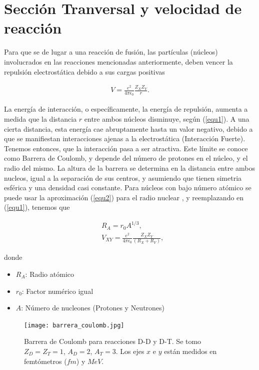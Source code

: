 \documentclass[../main.tex]{subfiles}
\begin{document}
    \section{Sección Tranversal y velocidad de reacción}
	Para que se de lugar a una reacción de fusión, las partículas (núcleos) involucrados en las reacciones mencionadas anteriormente, deben vencer la repulsión electrostática debido a sus cargas positivas  
	
	\begin{align} \label{equ1}
	    V = \frac{e^2}{4\pi\epsilon_0}\frac{Z_XZ_Y}{r}.
	\end{align}
	
	La energía de interacción, o específicamente, la energía de repulsión, aumenta a medida que la distancia $r$ entre ambos núcleos disminuye, según (\ref{equ1}). A una cierta distancia, esta energía cae abruptamente hasta un valor negativo, debido a que se manifiestan interacciones ajenas a la electrostática (Interacción Fuerte). Tenemos entonces, que la interacción pasa a ser atractiva. Este límite se conoce como Barrera de Coulomb, y depende del número de protones en el núcleo, y el radio del mismo. La altura de la barrera se determina en la distancia entre ambos nucleos, igual a la separación de sus centros, y asumiendo que tienen simetria esférica y una densidad casi constante. Para núcleos con bajo número atómico se puede usar la aproximación (\ref{equ2}) para el radio nuclear \cite{krane1987introductory}, y reemplazando en (\ref{equ1}), tenemos que
	
	\begin{align} \label{equ2}
	    &R_A = r_0A^{1/3}, \\
	    &V_{XY} = \frac{e^2}{4\pi\epsilon_0}\frac{Z_XZ_Y}{(R_X + R_Y)},
	\end{align}
	
	donde
	\begin{itemize}
	    \item $R_A$: Radio atómico
	    \item $r_0$: Factor numérico igual 
	    \item $A$: Número de nucleones (Protones y Neutrones)
	\end{itemize}
	
	\begin{figure}[h]
        \centering
        \texttt{[image: barrera\_coulomb.jpg]}
        \caption{Barrera de Coulomb para reacciones D-D y D-T. Se tomo $Z_D =Z_T = 1$, $A_D = 2$, $A_T=3$. Los ejes $x$ e $y$ están medidos en femtómetros ($fm$) y $MeV$. }
        \label{fig:imagen1}
    \end{figure}
	
\end{document}
